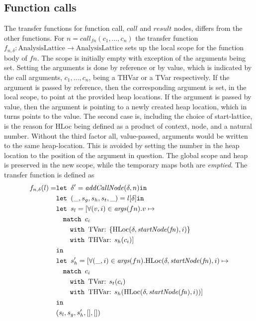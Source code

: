 \subsection{Function calls}
The transfer functions for function call, $\mathit{call}$ and $\mathit{result}$ nodes, differs from the other functions. For $n = \mathit{call}_{fn}(c_1,\dots,c_n)$ the transfer function $f_{n,\delta} : \text{AnalysisLattice} \rightarrow \text{AnalysisLattice}$ sets up the local scope for the function body of $fn$. The scope is initially empty with exception of the arguments being set. Setting the arguments is done by reference or by value, which is indicated by the call arguments, $c_1, \dots, c_n$, being a { THVar} or a { TVar} respectively. If the argument is passed by reference, then the corresponding argument is set, in the local scope, to point at the provided heap locations. If the argument is passed by value, then the argument is pointing to a newly created heap location, which in turns points to the value. The second case is, including the choice of start-lattice, is the reason for { HLoc} being defined as a product of context, node, and a natural number. Without the third factor all, value-passed, arguments would be written to the same heap-location. This is avoided by setting the number in the heap location to the position of the argument in question. The global scope and heap is preserved in the new scope, while the temporary maps both are \emph{emptied}. The transfer function is defined as
\begin{align}
      f_{n,\delta}(l) =     &\texttt{let } \delta' = \mathit{addCallNode}(\delta, n) \texttt{in }\notag\\
                            &\texttt{let } (\_, s_g, s_h,s_t, \_) = l[\delta] \texttt{in }\notag\\
                            &\texttt{let } s_l = [\forall (v, i) \in \mathit{args}(fn). v \mapsto \notag\\
                            &\quad\texttt{match }c_i\notag\\
                            &\quad\quad\texttt{with }\text{TVar}\text{: } \{\text{HLoc}(\delta, \mathit{startNode}(\mathit{fn}), i)\}\notag\\
                            &\quad\quad\texttt{with }\text{THVar}\text{: } s_h(c_i)]\notag\\
                            & \texttt{in }\notag\\
                            &\texttt{let } s_h' = [\forall (\_, i) \in \mathit{args}(fn). \text{HLoc}(\delta, \mathit{startNode}(\mathit{fn}), i) \mapsto \notag\\
                            &\quad\texttt{match }c_i\notag\\
                            &\quad\quad\texttt{with }\text{TVar}\text{: } s_t(c_i)\notag\\
                            &\quad\quad\texttt{with }\text{THVar}\text{: } s_h(\text{HLoc}(\delta, \mathit{startNode}(\mathit{fn}), i))]\notag\\
                            & \texttt{in }\notag\\
                            &(s_l, s_g, s_h',[], [])
\end{align}

